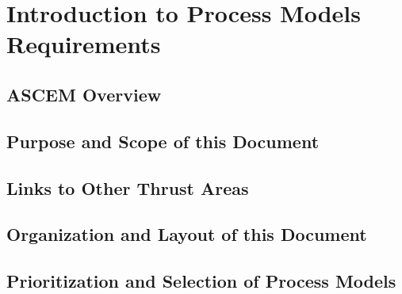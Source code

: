 %
%

\section{Introduction to Process Models Requirements}

\subsection{ASCEM Overview}

\subsection{Purpose and Scope of this Document}

\subsection{Links to Other Thrust Areas}

\subsection{Organization and Layout of this Document}

\subsection{Prioritization and Selection of Process Models}





